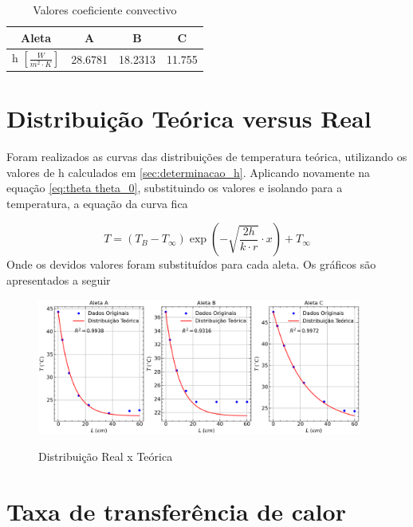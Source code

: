 \documentclass[12pt,openright,twoside,a4paper]{abntex2}
\begin{document}
\begin{table}[H]
	\caption{Valores coeficiente convectivo}
	\centering
	\begin{tabular}{c|c|c|c}
		\toprule
		Aleta                                       & A       & B       & C      \\
		\midrule
		h \(\left[ \frac{W}{m^2 \cdot K} \right] \) & 28.6781 & 18.2313 & 11.755 \\
		\bottomrule
	\end{tabular}
	\label{tab:valores_h}
\end{table}
%

\section{Distribuição Teórica versus Real}

Foram realizados as curvas das distribuições de temperatura teórica, utilizando os valores de h calculados em \ref{sec:determinacao_h}. Aplicando novamente na equação \eqref{eq:theta theta_0}, substituindo os valores e isolando para a temperatura, a equação da curva fica

\begin{equation}
	T = (T_B - T_{\infty}) \exp\left(- \sqrt{\frac{2h}{k\cdot r}}\cdot x\right) + T_\infty
\end{equation}
Onde os devidos valores foram substituídos para cada aleta. Os gráficos são apresentados a seguir
\begin{figure}[H]
	\caption{Distribuição Real x Teórica}
	\begin{center}
		\includegraphics[width=0.95\textwidth]{Imagens/distribuicoes.png}
	\end{center}
	\label{fig:real_x_teorica}
\end{figure}

\section{Taxa de transferência de calor}
\end{document}
